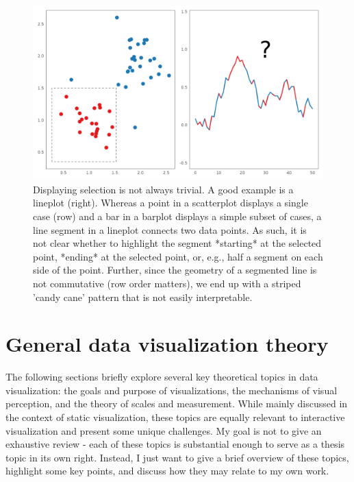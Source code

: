 \documentclass[
]{book}
\theoremstyle{definition}
\theoremstyle{definition}
\theoremstyle{definition}
\theoremstyle{definition}
\theoremstyle{remark}
\begin{document}
\begin{figure}

{\centering \includegraphics[width=1\linewidth,height=1\textheight]{./figures/line-consistency} 

}

\caption{Displaying selection is not always trivial. A good example is a lineplot (right). Whereas a point in a scatterplot displays a single case (row) and a bar in a barplot displays a simple subset of cases, a line segment in a lineplot connects two data points. As such, it is not clear whether to highlight the segment *starting* at the selected point, *ending* at the selected point, or, e.g., half a segment on each side of the point. Further, since the geometry of a segmented line is not commutative (row order matters), we end up with a striped 'candy cane' pattern that is not easily interpretable.}\label{fig:line-consistency}
\end{figure}

\section{General data visualization theory}\label{general-data-visualization-theory}

The following sections briefly explore several key theoretical topics in data visualization: the goals and purpose of visualizations, the mechanisms of visual perception, and the theory of scales and measurement. While mainly discussed in the context of static visualization, these topics are equally relevant to interactive visualization and present some unique challenges. My goal is not to give an exhaustive review - each of these topics is substantial enough to serve as a thesis topic in its own right. Instead, I just want to give a brief overview of these topics, highlight some key points, and discuss how they may relate to my own work.
\end{document}
